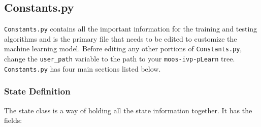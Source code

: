 \documentclass[onecolumn,letterpaper,11pt]{article}
\begin{document}
\subsection{Constants.py}
\texttt{Constants.py} contains all the important information for the training and testing algorithms and is the primary file that needs to be edited to customize the machine learning model. Before editing any other portions of \texttt{Constants.py}, change the \texttt{user\_path} variable to the path to your \texttt{moos-ivp-pLearn} tree. \texttt{Constants.py} has four main sections listed below.

\subsubsection{State Definition}
The state class is a way of holding all the state information together. It has the fields:
\end{document}
